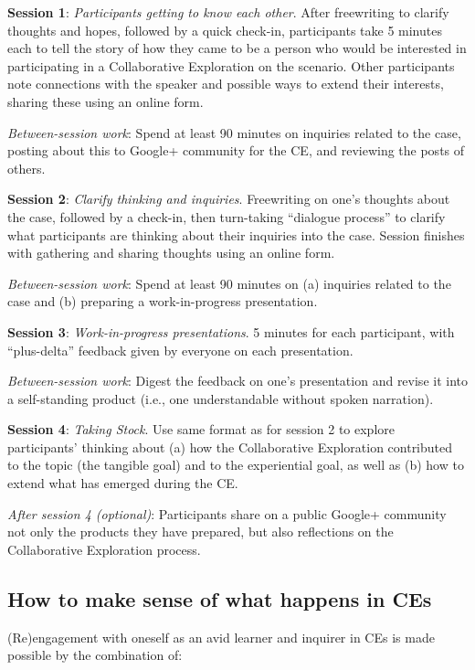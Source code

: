 \textbf{Session 1}: \emph{Participants getting to know each other}.
After freewriting to clarify thoughts and hopes, followed by a quick
check-in, participants take 5 minutes each to tell the story of how they
came to be a person who would be interested in participating in a
Collaborative Exploration on the scenario. Other participants note
connections with the speaker and possible ways to extend their
interests, sharing these using an online form.

\emph{Between-session work}: Spend at least 90 minutes on inquiries
related to the case, posting about this to Google+ community for the CE,
and reviewing the posts of others.

\textbf{Session 2}: \emph{Clarify thinking and inquiries}. Freewriting
on one's thoughts about the case, followed by a check-in, then
turn-taking ``dialogue process'' to clarify what participants are
thinking about their inquiries into the case. Session finishes with
gathering and sharing thoughts using an online form.

\emph{Between-session work}: Spend at least 90 minutes on (a) inquiries
related to the case and (b) preparing a work-in-progress presentation.

\textbf{Session 3}: \emph{Work-in-progress presentations}. 5 minutes for
each participant, with ``plus-delta'' feedback given by everyone on each
presentation.

\emph{Between-session work}: Digest the feedback on one's presentation
and revise it into a self-standing product (i.e., one understandable
without spoken narration).

\textbf{Session 4}: \emph{Taking Stock}. Use same format as for session
2 to explore participants' thinking about (a) how the Collaborative
Exploration contributed to the topic (the tangible goal) and to the
experiential goal, as well as (b) how to extend what has emerged during
the CE.

\emph{After session 4 (optional)}: Participants share on a public
Google+ community not only the products they have prepared, but also
reflections on the Collaborative Exploration process.

\hypertarget{how-to-make-sense-of-what-happens-in-ces}{%
\subsection{How to make sense of what happens in
CEs}\label{how-to-make-sense-of-what-happens-in-ces}}

(Re)engagement with oneself as an avid learner and inquirer in CEs is
made possible by the combination of:

